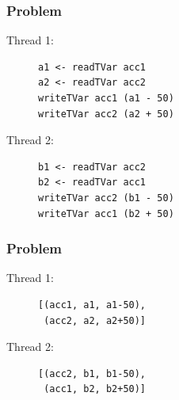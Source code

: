 \documentclass{beamer}
\begin{document}

\begin{frame}[fragile]
    \frametitle{Problem}
    \fboxsep=0pt
    \noindent
    \begin{minipage}[t]{0.48\linewidth}
      Thread 1:
    \begin{figure}
     \begin{lstlisting}[frame=single]
a1 <- readTVar acc1
a2 <- readTVar acc2
writeTVar acc1 (a1 - 50)
writeTVar acc2 (a2 + 50)
     \end{lstlisting}
    \end{figure}
    \end{minipage}%
    \hfill%
    \begin{minipage}[t]{0.48\linewidth}
      Thread 2:
    \begin{figure}
     \begin{lstlisting}[frame=single]
b1 <- readTVar acc2
b2 <- readTVar acc1
writeTVar acc2 (b1 - 50)
writeTVar acc1 (b2 + 50)
     \end{lstlisting}
    \end{figure}
    \end{minipage}
\end{frame}


    \begin{frame}[fragile]
    \frametitle{Problem}
    \fboxsep=0pt
    \noindent
    \begin{minipage}[t]{0.48\linewidth}
      Thread 1:
    \begin{figure}
     \begin{lstlisting}[frame=single]
[(acc1, a1, a1-50),
 (acc2, a2, a2+50)]
     \end{lstlisting}
    \end{figure}
    \end{minipage}%
    \hfill%
    \begin{minipage}[t]{0.48\linewidth}
      Thread 2:
    \begin{figure}
     \begin{lstlisting}[frame=single]
[(acc2, b1, b1-50),
 (acc1, b2, b2+50)]
    \end{lstlisting}
    \end{figure}
    \end{minipage}
\end{frame}
\end{document}
